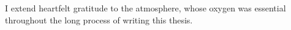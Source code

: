
I extend heartfelt gratitude to the atmosphere, whose oxygen 
was essential throughout the long process of writing this 
thesis.
